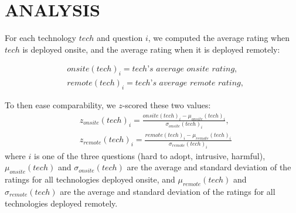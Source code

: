 \section{ANALYSIS}
\label{sec:analysis}

For each technology $tech$ and question $i$, we computed the average rating when $tech$ is deployed onsite, and the average rating when it is deployed remotely:

\begin{align*}
    & \textit{$onsite(tech)_{i}$} = \textit{$tech$'s average onsite rating}, \nonumber \\
    & \textit{$remote(tech)_{i}$} = \textit{$tech$'s average remote rating}, \nonumber
\end{align*}

To then ease comparability, we $z$-scored these two values:
\begin{align*}
    & z_{onsite}(tech)_i  =  \frac{onsite(tech)_i - \mu_{onsite}(tech)_i}{\sigma_{onsite}(tech)_i},  \nonumber \\
    & z_{remote}(tech)_i  =  \frac{remote(tech)_i - \mu_{remote}(tech)_i}{\sigma_{remote}(tech)_i} \nonumber
\end{align*}
where $i$ is one of the three questions (hard to adopt, intrusive, harmful), $\mu_{onsite}(tech)$ and $\sigma_{onsite}(tech)$ are the average and standard deviation of the ratings for all technologies deployed onsite, and $\mu_{remote}(tech)$ and $\sigma_{remote}(tech)$ are the average and standard deviation of the ratings for all technologies deployed remotely.